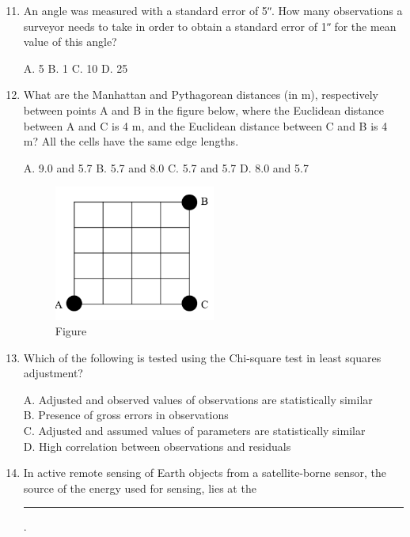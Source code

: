 \documentclass[journal,12pt,onecolumn]{IEEEtran}
\begin{document}
\begin{enumerate}
    \setcounter{enumi}{10}
    \item An angle was measured with a standard error of 5ʺ. How many observations a surveyor needs to take in order to obtain a standard error of 1ʺ for the mean value of this angle?

    A. 5 \quad
    B. 1 \quad
    C. 10 \quad
    D. 25

    \item What are the Manhattan and Pythagorean distances (in m), respectively between points A and B in the figure below, where the Euclidean distance between A and C is 4 m, and the Euclidean distance between C and B is 4 m? All the cells have the same edge lengths.

\begin{center}

\end{center}

    A. 9.0 and 5.7 \quad
    B. 5.7 and 8.0 \quad
    C. 5.7 and 5.7 \quad
    D. 8.0 and 5.7

\begin{figure}[h] 
    \centering
    \includegraphics[width=0.5\textwidth]{figs/qn12.png}
    \caption{Figure}
\label{fig:q12graph}
\end{figure}

    \item Which of the following is tested using the Chi-square test in least squares adjustment?

    A. Adjusted and observed values of observations are statistically similar \\
    B. Presence of gross errors in observations \\
    C. Adjusted and assumed values of parameters are statistically similar \\
    D. High correlation between observations and residuals

    \item In active remote sensing of Earth objects from a satellite-borne sensor, the source of the energy used for sensing, lies at the \rule{3cm}{0.15mm}.


\end{enumerate}
\end{document}
